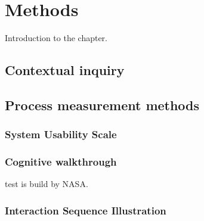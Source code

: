 \documentclass[12pt,a4paper,oneside,pdftex]{report}
\begin{document}

% 

\chapter{Methods}
\label{chapter:methods}
Introduction to the chapter.
    
    
    \section{Contextual inquiry}
    \label{sec:cinquiry}
    
    \section{Process measurement methods}
    \label{sec:measurement}
    
        \subsection{System Usability Scale}
        
        \subsection{Cognitive walkthrough} 
            test is build by NASA.\cite{hart1988development}
        \subsection{Interaction Sequence Illustration}
\end{document}

